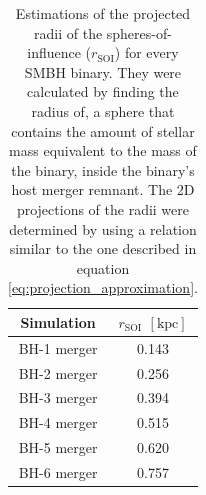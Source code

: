 \documentclass[english, oneside]{HYgradu}
\begin{document}
\begin{table}
	\begin{center}
		\begin{tabular}{| c | c |}
		\hline
		Simulation & $r_\mathrm{SOI}$ $\mathrm{[kpc]}$ \\
		\hline
		BH-1 merger & 0.143 \\
		BH-2 merger & 0.256 \\
		BH-3 merger & 0.394 \\
		BH-4 merger & 0.515 \\
		BH-5 merger & 0.620 \\
		BH-6 merger & 0.757 \\
		\hline
		\end{tabular}
	\end{center}
	\caption{Estimations of the projected radii of the spheres-of-influence ($r_\mathrm{SOI}$) for every SMBH binary. They were calculated by finding the radius of, a sphere that contains the amount of stellar mass equivalent to the mass of the binary, inside the binary's host merger remnant. The 2D projections of the radii were determined by using a relation similar to the one described in equation \ref{eq:projection_approximation}.}
	\label{table:s-o-i}
\end{table}
\end{document}

